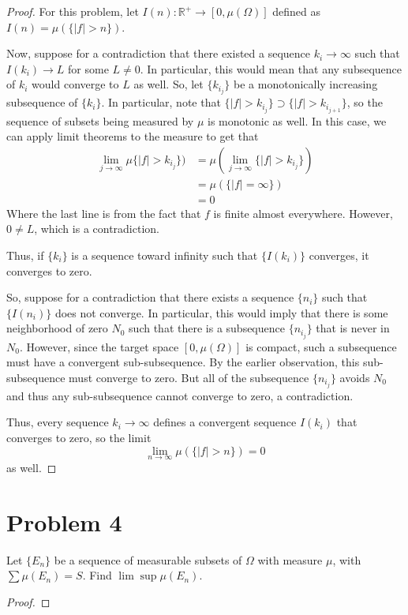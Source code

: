 \documentclass[fontsize=11pt]{scrartcl} %
\numberwithin{equation}{section} %
\numberwithin{figure}{section} %
\numberwithin{table}{section} %
\newcommand{\R}{\mathbb{R}}
\begin{document}
\begin{proof}
For this problem, let $I(n): \R^{+}\to [0,\mu(\Omega)]$ defined as $I(n) = \mu(\{|f|>n\})$.

Now, suppose for a contradiction that there existed a sequence $k_i\to\infty$ such that
$I(k_i)\to L$ for some $L\neq 0$. In particular, this would mean that any subsequence
of $k_i$ would converge to $L$ as well. So, let $\{k_{i_j}\}$ be a monotonically increasing
subsequence of $\{k_i\}$. In particular, note that $\{|f| > k_{i_j}\}\supset\{|f| > k_{i_{j+1}}\}$,
so the sequence of subsets being measured by $\mu$ is monotonic as well. In this case,
we can apply limit theorems to the measure to get that
\[
\begin{aligned}
\lim_{j\to\infty} \mu\{|f| > k_{i_j}\}) &= \mu\left(\lim_{j\to\infty} \{|f| > k_{i_j}\}\right)\\
                                        &= \mu(\{|f| = \infty\})\\
                                        &= 0
\end{aligned}
\]
Where the last line is from the fact that $f$ is finite almost everywhere.
However, $0\neq L$, which is a contradiction.

Thus, if $\{k_i\}$ is a sequence toward infinity such that $\{I(k_i)\}$ converges, it converges
to zero.

So, suppose for a contradiction that there exists a sequence $\{n_i\}$ such that $\{I(n_i)\}$
does not converge. In particular, this would imply that there is some neighborhood of zero $N_0$
such that there is a subsequence $\{n_{i_j}\}$ that is never in $N_0$. However,
since the target space $[0,\mu(\Omega)]$ is compact, such a subsequence must have a convergent
sub-subsequence. By the earlier observation, this sub-subsequence must converge to zero. But 
all of the subsequence $\{n_{i_j}\}$ avoids $N_0$ and thus any sub-subsequence cannot converge
to zero, a contradiction.

Thus, every sequence $k_i\to\infty$ defines a convergent sequence $I(k_i)$ that converges
to zero, so the limit 
\[
\lim_{n\to\infty} \mu(\{|f|> n\}) = 0
\]
as well.
\end{proof}
\section*{Problem 4}
Let $\{E_n\}$ be a sequence of measurable subsets of $\Omega$ with measure $\mu$, with
$\sum\mu(E_n) = S$. Find $\lim\sup\mu(E_n)$.
\\
\begin{proof}

\end{proof}
\end{document}
